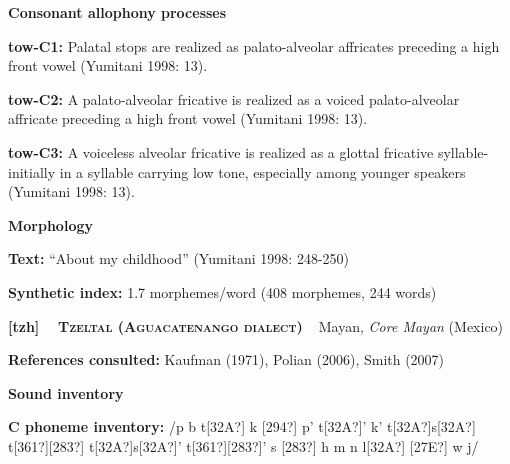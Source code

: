 \begin{styleBody}
\textbf{Consonant allophony processes}
\end{styleBody}

\begin{styleBody}
\textbf{tow-C1: }Palatal stops are realized as palato-alveolar affricates preceding a high front vowel (Yumitani 1998: 13).
\end{styleBody}

\begin{styleBody}
\textbf{tow-C2: }A palato-alveolar fricative is realized as a voiced palato-alveolar affricate preceding a high front vowel (Yumitani 1998: 13).
\end{styleBody}

\begin{styleBody}
\textbf{tow-C3: }A voiceless alveolar fricative is realized as a glottal fricative syllable-initially in a syllable carrying low tone, especially among younger speakers (Yumitani 1998: 13).
\end{styleBody}

\begin{styleBody}
\textbf{Morphology}
\end{styleBody}

\begin{styleBody}
\textbf{Text:} “About my childhood” (Yumitani 1998: 248-250)
\end{styleBody}

\begin{styleBody}
\textbf{Synthetic index: }1.7 morphemes/word (408 morphemes, 244 words)
\end{styleBody}

\clearpage\begin{styleBody}
\textbf{[tzh] }\ \ \textbf{\textsc{Tzeltal (Aguacatenango dialect)}}\textbf{\ \ }Mayan, \textit{Core Mayan} (Mexico)
\end{styleBody}

\begin{styleBody}
\textbf{References consulted: }Kaufman (1971), Polian (2006), Smith (2007)
\end{styleBody}

\begin{styleBody}
\textbf{Sound inventory}
\end{styleBody}

\begin{styleBody}
\textbf{C phoneme inventory:} /p b t[32A?] k [294?] p’ t[32A?]’ k’ t[32A?]s[32A?] t[361?][283?] t[32A?]s[32A?]’ t[361?][283?]’ s [283?] h m n l[32A?] [27E?] w j/
\end{styleBody}

